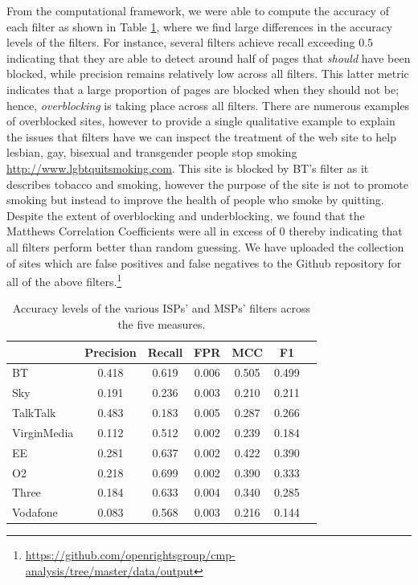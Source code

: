 \documentclass{bmcart}
\begin{document}
From the computational framework, we were able to compute the accuracy of each filter as shown in Table \ref{tab:accuracy}, where we find large differences in the accuracy levels of the filters.
For instance, several filters achieve recall exceeding $0.5$ indicating that they are able to detect around half of pages that \textit{should} have been blocked, while precision remains relatively low across all filters.
This latter metric indicates that a large proportion of pages are blocked when they should not be; hence, \textit{overblocking} is taking place across all filters.
There are numerous examples of overblocked sites, however to provide a single qualitative example to explain the issues that filters have we can inspect the treatment of the web site to help lesbian, gay, bisexual and transgender people stop smoking \url{http://www.lgbtquitsmoking.com}.
This site is blocked by BT's filter as it describes tobacco and smoking, however the purpose of the site is not to promote smoking but instead to improve the health of people who smoke by quitting.
Despite the extent of overblocking and underblocking, we found that the Matthews Correlation Coefficients were all in excess of $0$ thereby indicating that all filters perform better than random guessing.
We have uploaded the collection of sites which are false positives and false negatives to the Github repository for all of the above filters.\footnote{\url{https://github.com/openrightsgroup/cmp-analysis/tree/master/data/output}}

\begin{table}[h!]
\caption{Accuracy levels of the various ISPs' and MSPs' filters across the five measures.}
  \begin{tabular}{ l c c c c c c}
    \hline
     & Precision & Recall & FPR & MCC & F1 \\
    \hline
	BT & 0.418 & 0.619 & 0.006 & 0.505 & 0.499 \\
    Sky & 0.191 & 0.236 & 0.003 & 0.210 & 0.211 \\
    TalkTalk & 0.483 & 0.183 & 0.005 & 0.287 & 0.266 \\
	VirginMedia & 0.112 & 0.512 & 0.002 & 0.239 & 0.184 \\
	\hline    
	EE & 0.281 & 0.637 & 0.002 & 0.422 & 0.390 \\
	O2 & 0.218 & 0.699 & 0.002 & 0.390 & 0.333 \\
	Three & 0.184 & 0.633 & 0.004 & 0.340 & 0.285 \\
	Vodafone & 0.083 & 0.568 & 0.003 & 0.216 & 0.144 \\
    \hline
  \end{tabular}
  \label{tab:accuracy}
\end{table}
\end{document}
